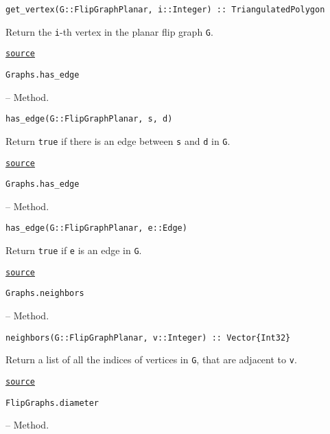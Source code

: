 \begin{adjustwidth}{2em}{0pt}


\begin{verbatim}
get_vertex(G::FlipGraphPlanar, i::Integer) :: TriangulatedPolygon
\end{verbatim}

Return the \texttt{i}-th vertex in the planar flip graph \texttt{G}.



\href{https://github.com/schto223/FlipGraphs.jl/blob/490c01a7adf74b42f27dda05099165c47ae8133e/src/flipGraphPlanar.jl#L97-L101}{\texttt{source}}


\end{adjustwidth}
\hypertarget{13899120146903475816}{\texttt{Graphs.has\_edge}}  -- {Method.}

\begin{adjustwidth}{2em}{0pt}


\begin{verbatim}
has_edge(G::FlipGraphPlanar, s, d)
\end{verbatim}

Return \texttt{true} if there is an edge between \texttt{s} and \texttt{d} in \texttt{G}.



\href{https://github.com/schto223/FlipGraphs.jl/blob/490c01a7adf74b42f27dda05099165c47ae8133e/src/flipGraphPlanar.jl#L43-L47}{\texttt{source}}


\end{adjustwidth}
\hypertarget{5416200093936098716}{\texttt{Graphs.has\_edge}}  -- {Method.}

\begin{adjustwidth}{2em}{0pt}


\begin{verbatim}
has_edge(G::FlipGraphPlanar, e::Edge)
\end{verbatim}

Return \texttt{true} if \texttt{e} is an edge in \texttt{G}.



\href{https://github.com/schto223/FlipGraphs.jl/blob/490c01a7adf74b42f27dda05099165c47ae8133e/src/flipGraphPlanar.jl#L36-L40}{\texttt{source}}


\end{adjustwidth}
\hypertarget{4523162264564818691}{\texttt{Graphs.neighbors}}  -- {Method.}

\begin{adjustwidth}{2em}{0pt}


\begin{verbatim}
neighbors(G::FlipGraphPlanar, v::Integer) :: Vector{Int32}
\end{verbatim}

Return a list of all the indices of vertices in \texttt{G}, that are adjacent to \texttt{v}.



\href{https://github.com/schto223/FlipGraphs.jl/blob/490c01a7adf74b42f27dda05099165c47ae8133e/src/flipGraphPlanar.jl#L67-L71}{\texttt{source}}


\end{adjustwidth}
\hypertarget{14666488080537054881}{\texttt{FlipGraphs.diameter}}  -- {Method.}

